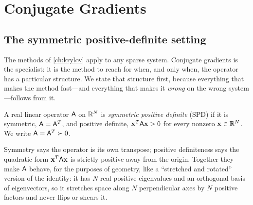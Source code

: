 \chapter{Conjugate Gradients}
\label{ch:cg}


\section{The symmetric positive-definite setting}
\label{sec:spd}

The methods of \cref{ch:krylov} apply to any sparse system. Conjugate gradients
is the specialist: it is the method to reach for when, and only when, the
operator has a particular structure. We state that structure first, because
everything that makes the method fast---and everything that makes it
\emph{wrong} on the wrong system---follows from it.

\begin{definition}
\label{def:spd}
A real linear operator $\mathsf{A}$ on $\mathbb{R}^N$ is \emph{symmetric positive
definite} (SPD) if it is symmetric, $\mathsf{A}=\mathsf{A}^{T}$, and positive
definite, $\mathbf{x}^{T}\mathsf{A}\mathbf{x}>0$ for every nonzero $\mathbf{x}\in\mathbb{R}^N$. We write
$\mathsf{A}=\mathsf{A}^{T}\succ0$.
\end{definition}

Symmetry says the operator is its own transpose; positive definiteness says the
quadratic form $\mathbf{x}^{T}\mathsf{A}\mathbf{x}$ is strictly positive away from the origin.
Together they make $\mathsf{A}$ behave, for the purposes of geometry, like a
``stretched and rotated'' version of the identity: it has $N$ real positive
eigenvalues and an orthogonal basis of eigenvectors, so it stretches space along
$N$ perpendicular axes by $N$ positive factors and never flips or shears it.

